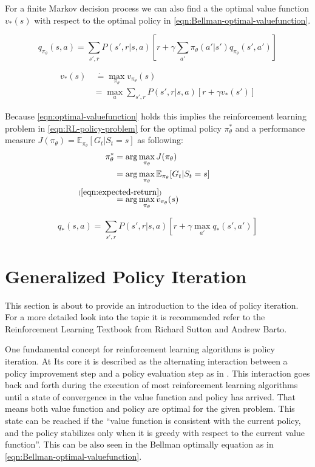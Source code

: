 For a finite Markov decision process we can also find a the optimal value function $v_*(s)$ with respect to the optimal policy in \eqref{eqn:Bellman-optimal-valuefunction}. 

\begin{equation}\label{eqn:Bellman-action-valuefunction}
	q_{\pi_\theta}(s, a) = \sum_{s', r} P(s', r |s, a) \left[r + \gamma \sum_{a'} \pi_\theta(a'| s')q_{\pi_\theta}(s', a')\right]
\end{equation}

\begin{align}
	v_*(s) & \ \dot{=} \max_{\pi_\theta} v_{\pi_\theta}(s) \label{eqn:optimal-valuefunction} \\
	&=\max_a \sum_{s', r} P(s', r| s, a)[r + \gamma v_*(s')] \label{eqn:Bellman-optimal-valuefunction}
\end{align}

Because \eqref{eqn:optimal-valuefunction} holds this implies the reinforcement learning problem in \eqref{eqn:RL-policy-problem} for the optimal policy $\pi_\theta^*$ and a performance measure $J(\pi_\theta) = \mathbb{E}_{\pi_\theta}[G_t | S_t = s]$ as following:
\begin{align}
	\pi_\theta^* &= \arg \max_{\pi_\theta}J(\pi_\theta) \label{eqn:RL-policy-problem} \\
	&= \arg \max_{\pi_\theta} \mathbb{E}_{\pi_\theta}[G_t | S_t = s] \\
	&\overset{\mathclap{\strut(\ref{eqn:expected-return})}}{=} \arg \max_{\pi_\theta} v_{\pi_\theta}(s) \label{eqn:RL-policy-valuefunction}
\end{align}

\begin{equation}\label{eqn:Bellman-optimal-action-valuefunction}
	q_*(s, a) = \sum_{s', r} P(s', r|s, a)\left[r + \gamma \max_{a'} q_*(s', a')\right]
\end{equation}

\section{Generalized Policy Iteration}\label{sec:Generalized-Policy-Iteration}

This section is about to provide an introduction to the idea of policy iteration. For a more detailed look into the topic it is recommended refer to the Reinforcement Learning Textbook from Richard Sutton and Andrew Barto.

One fundamental concept for reinforcement learning algorithms is policy iteration. At Its core it is described as the alternating interaction between a policy improvement step and a policy evaluation step as in . This interaction goes back and forth during the execution of most reinforcement learning algorithms until a state of convergence in the value function and policy has arrived. That means both value function and policy are optimal for the given problem. This state can be reached if the ``value function is consistent with the current policy, and the policy stabilizes only when it is greedy with respect to the current value function''. This can be also seen in the Bellman optimally equation as in \eqref{eqn:Bellman-optimal-valuefunction}. 

